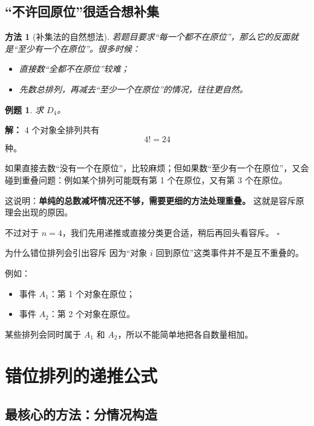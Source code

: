 \documentclass[11pt,a4paper,fontset=fandol]{ctexart}
\theoremstyle{formaltheorem}
\newtheorem{method}{方法}[section]
\theoremstyle{formalexample}
\newtheorem{example}{例题}[section]
\newenvironment{solution}{\par\noindent\textbf{解：}}{\hfill$\square$\par}
\begin{document}
\subsection{“不许回原位”很适合想补集}

\begin{method}[补集法的自然想法]
若题目要求“每一个都不在原位”，那么它的反面就是“至少有一个在原位”。很多时候：
\begin{itemize}
  \item 直接数“全都不在原位”较难；
  \item 先数总排列，再减去“至少一个在原位”的情况，往往更自然。
\end{itemize}
\end{method}

\begin{example}
求 $D_4$。
\end{example}

\begin{solution}
4 个对象全排列共有
\[
4!=24
\]
种。

如果直接去数“没有一个在原位”，比较麻烦；但如果数“至少有一个在原位”，又会碰到重叠问题：例如某个排列可能既有第 1 个在原位，又有第 3 个在原位。

这说明：\textbf{单纯的总数减坏情况还不够，需要更细的方法处理重叠。} 这就是容斥原理会出现的原因。

不过对于 $n=4$，我们先用递推或直接分类更合适，稍后再回头看容斥。
\end{solution}

\begin{notebox}{为什么错位排列会引出容斥}
因为“对象 $i$ 回到原位”这类事件并不是互不重叠的。

例如：
\begin{itemize}
  \item 事件 $A_1$：第 1 个对象在原位；
  \item 事件 $A_2$：第 2 个对象在原位。
\end{itemize}
某些排列会同时属于 $A_1$ 和 $A_2$，所以不能简单地把各自数量相加。
\end{notebox}

\section{错位排列的递推公式}

\subsection{最核心的方法：分情况构造}
\end{document}
